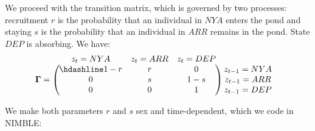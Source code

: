 \documentclass[
  12pt,
]{krantz}
\begin{document}
We proceed with the transition matrix, which is governed by two processes: recruitment \(r\) is the probability that an individual in \(NYA\) enters the pond and staying \(s\) is the probability that an individual in \(ARR\) remains in the pond. State \(DEP\) is absorbing. We have:
\[\begin{matrix}
& \\
\mathbf{\Gamma} =
\left ( \vphantom{ \begin{matrix} 12 \\ 12 \\ 12 \end{matrix} } \right .
\end{matrix}
\hspace{-1.2em}
\begin{matrix}
z_t=NYA & z_t=ARR & z_t=DEP \\ \hdashline
1 - r & r & 0 \\
0 & s & 1 - s \\
0 & 0 & 1
\end{matrix}
\hspace{-0.2em}
\begin{matrix}
& \\
\left . \vphantom{ \begin{matrix} 12 \\ 12 \\ 12 \end{matrix} } \right )
\begin{matrix}
z_{t-1}=NYA \\ z_{t-1}=ARR \\ z_{t-1}=DEP
\end{matrix}
\end{matrix}\]

We make both parameters \(r\) and \(s\) sex and time-dependent, which we code in NIMBLE:
\end{document}
